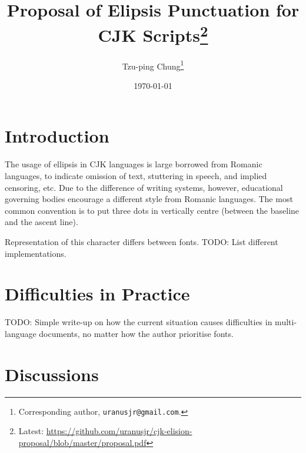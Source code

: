 \documentclass[a4paper, 12pt]{article}
\begin{document}
\title{Proposal of Elipsis Punctuation for CJK Scripts\footnote{Latest: \scriptsize \url{https://github.com/uranusjr/cjk-elision-proposal/blob/master/proposal.pdf}}}
\date{\today}

\author{Tzu-ping Chung\footnote{Corresponding author, \texttt{uranusjr@gmail.com}.}}

\maketitle



\section{Introduction}

The usage of ellipsis in CJK languages is large borrowed from Romanic languages, to indicate omission of text, stuttering in speech, and implied censoring, etc. Due to the difference of writing systems, however, educational governing bodies encourage a different style from Romanic languages. The most common convention is to put three dots in vertically centre (between the baseline and the ascent line). \cite{roc-punc, prc-punc}

Representation of this character differs between fonts. TODO: List different implementations.


\section{Difficulties in Practice}

TODO: Simple write-up on how the current situation causes difficulties in multi-language documents, no matter how the author prioritise fonts.


\section{Discussions}
\end{document}
